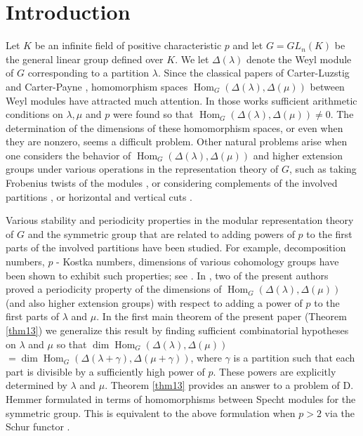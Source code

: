 \documentclass[11pt]{article}
\theoremstyle{definition}
\numberwithin{equation}{section}
\DeclareMathOperator{\Hom}{Hom}
\numberwithin{equation}{section}
\begin{document}
\section{Introduction} Let $K$ be an infinite field of positive characteristic $p$ and let $G=GL_n(K)$ be the general linear group defined over $K$. We let $\Delta({\lambda})$ denote the Weyl module of $G$ corresponding to a partition $\lambda$. Since the classical papers of Carter-Luzstig \cite{CL} and Carter-Payne \cite{CP}, homomorphism spaces $\Hom_G(\Delta(\lambda), \Delta(\mu))$ between Weyl modules have attracted much attention. In those works sufficient arithmetic conditions on $\lambda, \mu$ and $p$ were found so that $\Hom_G(\Delta(\lambda), \Delta(\mu)) \neq 0$. The determination of the dimensions of these homomorphism spaces, or even when they are nonzero, seems a difficult problem. Other natural problems arise when one considers the behavior of $\Hom_G(\Delta(\lambda), \Delta(\mu))$ and higher extension groups under various operations in the representation theory of $G$, such as taking Frobenius twists of the modules \cite{CPSK}, or considering complements of the involved partitions \cite{FHKD}, or horizontal and vertical cuts \cite{FL, D, BG}.  

Various stability and periodicity properties in the modular representation theory of $G$ and the symmetric group that are related to adding powers of $p$ to the first parts of the involved partitions have  been studied. For example, decomposition numbers, $p$ - Kostka numbers, dimensions of various cohomology groups have been shown to exhibit such properties; see \cite{Gi, Ha, HK, Hen, NS}. In \cite[Theorem 1.1(1)]{MS4}, two of the present authors proved a periodicity property of the dimensions of $\Hom_G(\Delta(\lambda), \Delta(\mu))$ (and also higher extension groups) with respect to adding a power of $p$ to the first parts of $\lambda$ and $\mu$. In the first main theorem of the present paper (Theorem \ref{thm13})  we generalize this result by finding sufficient combinatorial hypotheses on $\lambda$ and $\mu$ so that $\dim\Hom_G(\Delta(\lambda), \Delta(\mu)) $ $=\dim\Hom_G(\Delta(\lambda +\gamma),\Delta(\mu + \gamma))$, where $\gamma$ is a partition such that each part is divisible by a  sufficiently high power of $p$. These powers are explicitly determined by $\lambda$ and $\mu$. Theorem \ref{thm13} provides an answer to a problem  of D. Hemmer \cite[Problem 5.4]{Hem2} formulated in terms of homomorphisms between Specht modules for the symmetric group. This is equivalent to the above formulation when $p>2$ via the Schur functor \cite{Gr}. 
\end{document}
